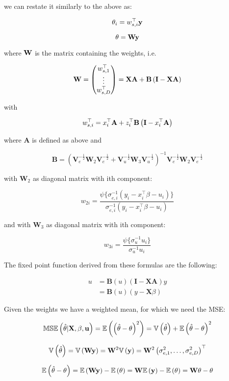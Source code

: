 we can restate it similarly to the above as:

\[
\theta_i = w_{s, i}^\top \mathbf{y}
\]

\[
\theta = \mathbf{W}\mathbf{y}
\]

where $\mathbf{W}$ is the matrix containing the weights, i.e.

\[
\mathbf{W} = \left(
  \begin{matrix}
  w_{s, 1}^\top\\
  \vdots \\
  w_{s, D}^\top\\
  \end{matrix}
\right) = \mathbf{X}\mathbf{A} + \mathbf{B} \left(\mathbf{I} - \mathbf{X} \mathbf{A}\right)
\]

with

\[
w_{s, i}^\top = x_i^\top \mathbf{A} + 
  z_i^\top \mathbf{B} \left(\mathbf{I} - x_i^\top \mathbf{A}\right)
\]

where $\mathbf{A}$ is defined as above and

\[
\mathbf{B} = 
\left(
  \mathbf{V}_e^{-\frac{1}{2}} \mathbf{W}_2 \mathbf{V}_e^{-\frac{1}{2}} +
  \mathbf{V}_u^{-\frac{1}{2}} \mathbf{W}_3 \mathbf{V}_u^{-\frac{1}{2}}
\right)^{-1} 
\mathbf{V}_e^{-\frac{1}{2}} \mathbf{W}_2 \mathbf{V}_e^{-\frac{1}{2}}
\]

with $\mathbf{W}_2$ as diagonal matrix with ith component:

\[
w_{2i} = 
\frac{
  \psi\{\sigma^{-1}_{e, i} (y_i - x_i^\top \beta - u_i)\}
}{
  \sigma^{-1}_{e, i} (y_i - x_i^\top \beta - u_i)
}
\]

and with $\mathbf{W}_3$ as diagonal matrix with ith component:

\[
w_{3i} = \frac{
  \psi\{\sigma_u^{-1} u_i\}
}{
  \sigma_u^{-1} u_i
}
\]

The fixed point function derived from these formulas are the following:

\begin{align*}
u &= \mathbf{B}(u)\left(\mathbf{I} - \mathbf{X}\mathbf{A}\right)y \\
  &= \mathbf{B}(u)\left(y - \mathbf{X}\beta\right)
\end{align*}

Given the weights we have a weighted mean, for which we need the MSE:

\[
\mathbb{MSE}\left(\hat{\theta}|\mathbf{X}, \beta, \mathbf{u}\right) 
  = \mathbb{E}\left(\left(\hat{\theta} - \theta\right)^2\right)
  = \mathbb{V}\left(\hat{\theta}\right) + \mathbb{E}\left(\hat{\theta} - \theta\right)^2
\]

\[
\mathbb{V}\left(\hat{\theta}\right) 
  = \mathbb{V}\left(\mathbf{Wy}\right)
  = \mathbf{W}^2 \mathbb{V}\left(\mathbf{y}\right)
  = \mathbf{W}^2 \left(\sigma_{e, 1}^2, \dots, \sigma_{e, D}^2\right)^\top
\]

\[
\mathbb{E}\left(\hat{\theta} - \theta\right)
  = \mathbb{E}\left(\mathbf{Wy}\right) - \mathbb{E}\left(\theta\right)
  = \mathbf{W} \mathbb{E}\left(\mathbf{y}\right) - \mathbb{E}\left(\theta\right)
  = \mathbf{W} \theta - \theta
\]
